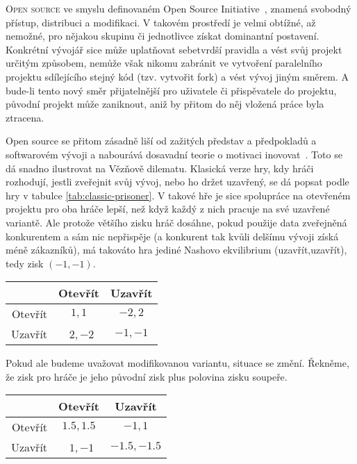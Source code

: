 \listoftodos
\hrulefill
\begin{multicols}{2}
\lettrine[nindent=0em,lines=3]{O}{pen source} ve smyslu definovaném Open Source Initiative~\cite{OSI-2011}, znamená svobodný přístup, distribuci a modifikaci. V takovém prostředí je velmi obtížné, až nemožné, pro nějakou skupinu či jednotlivce získat dominantní postavení. Konkrétní vývojář sice může uplatňovat sebetvrdší pravidla a vést svůj projekt určitým způsobem, nemůže však nikomu zabránit ve vytvoření paralelního projektu sdílejícího stejný kód (tzv. vytvořit fork) a vést vývoj jiným směrem. A bude-li tento nový směr přijatelnější pro uživatele či přispěvatele do projektu, původní projekt může zaniknout, aniž by přitom do něj vložená práce byla ztracena.

Open source se přitom zásadně liší od zažitých představ a předpokladů a softwarovém vývoji a nabourává dosavadní teorie o motivaci inovovat~\cite{promise-of-research-opensource}. Toto se dá snadno ilustrovat na Vězňově dilematu. Klasická verze hry, kdy hráči rozhodují, jestli zveřejnit svůj vývoj, nebo ho držet uzavřený, se dá popsat podle hry v tabulce \ref{tab:classic-prisoner}. V takové hře je sice spolupráce na otevřeném projektu pro oba hráče lepší, než když každý z nich pracuje na své uzavřené variantě. Ale protože většího zisku hráč dosáhne, pokud použije data zveřejněná konkurentem a sám nic nepřispěje (a konkurent tak kvůli delšímu vývoji získá méně zákazníků), má takováto hra jediné Nashovo ekvilibrium (uzavřít,uzavřít), tedy zisk $(-1,-1)$.

\begin{Figure}
\begin{center}
\begin{tabular}{r| c c}
		& Otevřít & Uzavřít \\
		\hline
	Otevřít & $1,1$ & $-2,2$ \\
	Uzavřít & $2,-2$ &\cellcolor{gray!20}  $-1,-1$ \\
\end{tabular}
\end{center}
\label{tab:classic-prisoner}
\end{Figure}

Pokud ale budeme uvažovat modifikovanou variantu, situace se změní. Řekněme, že zisk pro hráče je jeho původní zisk plus polovina zisku soupeře.

\begin{Figure}
\begin{center}
\begin{tabular}{r| c c}
		& Otevřít & Uzavřít \\
		\hline
	Otevřít &\cellcolor{gray!20}  $1.5,1.5$ & $-1,1$ \\
	Uzavřít & $1,-1$ &\cellcolor{gray!20}  $-1.5,-1.5$ \\
\end{tabular}
\end{center}
\label{tab:new-prisoner}
\end{Figure}


\end{multicols}
